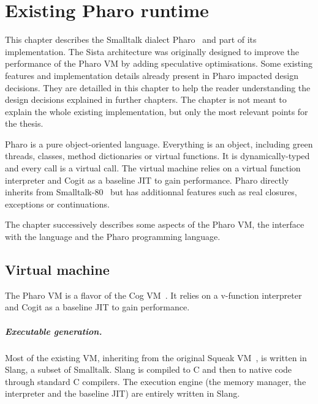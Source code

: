 \documentclass[a4paper,12pt,twoside]{../includes/ThesisStyle}
\begin{document}
\fi

\chapter{Existing Pharo runtime}
\label{chap:existing}
\minitoc

This chapter describes the Smalltalk dialect Pharo~\cite{Blac09a} and part of its implementation. The Sista architecture was originally designed to improve the performance of the Pharo VM by adding speculative optimisations. Some existing features and implementation details already present in Pharo impacted design decisions. They are detailled in this chapter to help the reader understanding the design decisions explained in further chapters. The chapter is not meant to explain the whole existing implementation, but only the most relevant points for the thesis. 

Pharo is a pure object-oriented language. Everything is an object, including green threads, classes, method dictionaries or virtual functions. It is dynamically-typed and every call is a virtual call. The virtual machine relies on a virtual function interpreter and Cogit as a baseline JIT to gain performance. Pharo directly inherits from Smalltalk-80~\cite{Gold83a} but has additionnal features such as real closures, exceptions or continuations.

The chapter successively describes some aspects of the Pharo VM, the interface with the language and the Pharo programming language.


\section{Virtual machine}

The Pharo VM is a flavor of the Cog VM~\cite{Mira08a}. It relies on a v-function interpreter and Cogit as a baseline JIT to gain performance.

\paragraph{Executable generation.}
Most of the existing VM, inheriting from the original Squeak VM~\cite{Inga97a}, is written in Slang, a subset of Smalltalk. Slang is compiled to C and then to native code through standard C compilers. The execution engine (the memory manager, the interpreter and the baseline JIT) are entirely written in Slang.
\end{document}

